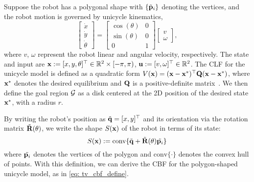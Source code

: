 Suppose the robot has a polygonal shape with $\{\tilde{\mathbf{p}}_i\}$ denoting the vertices, and the robot motion is governed by unicycle kinematics,
\begin{equation}
\label{eq: unicycle_model}
\begin{bmatrix} \dot{x} \\ \dot{y} \\ \dot{\theta} \end{bmatrix} = \begin{bmatrix}\cos(\theta) &0 \\ \sin(\theta)  &0\\ 0 &1  \end{bmatrix} \begin{bmatrix}
    v \\ \omega
\end{bmatrix},
\end{equation}
%
where $v$, $\omega$ represent the robot linear and angular velocity, respectively. The state and input are $\mathbf{x} := [x , y ,\theta]^\top \in \mathbb{R}^2 \times [-\pi,\pi)$, $\mathbf{u} := [v,\omega]^\top \in \mathbb{R}^2$. The CLF for the unicycle model is defined as a quadratic form $
V(\mathbf{x}) = (\mathbf{x} - \mathbf{x}^*)^\top \mathbf{Q} (\mathbf{x} - \mathbf{x}^*)$, where $\mathbf{x}^*$ denotes the desired equilibrium and $\mathbf{Q}$ is a positive-definite matrix~\cite{unicycle_clf}. We then define the goal region ${\cal G}$ as a disk centered at the 2D position of the desired state $\mathbf{x}^*$, with a radius $r$.
 
By writing the robot's position as $ \tilde{\mathbf{q}} = [x,y]^\top $ and its orientation via the rotation matrix $ \tilde{\mathbf{R}}(\theta) $, we write the shape $S(\mathbf{x})$ of the robot in terms of its state:
\begin{equation}
    S(\mathbf{x}) := \text{conv}\{\tilde{\mathbf{q}} + \tilde{\mathbf{R}}(\theta) \tilde{\mathbf{p}_i}\} 
\end{equation}
%
where $\tilde{\mathbf{p}_i}$ denotes the vertices of the polygon and $\text{conv}\{ \cdot \}$ denotes the convex hull of points. With this definition, we can derive the CBF for the polygon-shaped unicycle model, as in \eqref{eq: tv_cbf_define}.



